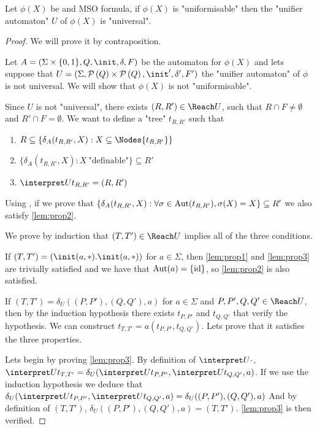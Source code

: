 \documentclass{article}
\begin{document}
\begin{lemma}
	Let $\phi(X)$ be and MSO formula, if $\phi(X)$ is "uniformisable" then the "unifier automaton" $U$ of $\phi(X)$ is "universal".
\end{lemma}

\begin{proof}
	We will prove it by contraposition.

	Let $A =  (\Sigma \times \{0,1\}, Q, \init, \delta, F)$ be the automaton for $\phi(X)$ and lets suppose that
	$U = (\Sigma, \parts Q \times \parts Q,\init', \delta', F')$ the "unifier automaton" of $\phi$ is not universal.
	We will show that $\phi(X)$ is not "uniformisable".

	Since $U$ is not "universal", there exists $(R,R') \in \Reach U$, such that $R \cap F \neq \emptyset$ and $R' \cap F = \emptyset$.
	We want to define a "tree" $t_{R,R'}$ such that
	\begin{enumerate}
		\item $R \subseteq \{ \delta_A (t_{R,R'},X) : X \subseteq \Nodes {t_{R,R'}}\}$ \label{lem:prop1}
		\item $\{ \delta_A (t_{R,R'},X) : X \ \text{"definable"}\} \subseteq R'$\label{lem:prop2}
		\item $\interpret U {t_{R,R'}} = (R,R')$\label{lem:prop3}
	\end{enumerate}

	Using , if we prove that $\{ \delta_A (t_{R,R'},X) : \forall \sigma \in \text{Aut}(t_{R,R'}), \sigma(X) = X\} \subseteq R'$ we also
	satisfy \ref{lem:prop2}.


	We prove by induction that $(T,T') \in \Reach U$ implies all of the three conditions.

	If $(T,T') = (\init(a,*). \init (a, *))$ for $a \in \Sigma$, then \ref{lem:prop1} and \ref{lem:prop3} are trivially satisfied and we have that
	$\text{Aut} (a) = \{\text{id}\}$, so \ref{lem:prop2} is also satisfied.


	If $(T,T') = \delta_U((P,P'),(Q,Q'),a)$ for $a \in \Sigma$ and $P,P',Q,Q' \in \Reach U$, then by the induction hypothesis there exists
	$t_{P,P'}$ and $t_{Q,Q'}$ that verify the hypothesis. We can construct $t_{T,T'} = a(t_{P,P'},t_{Q,Q'})$. Lets prove that it satisfies the
	three properties.

    Lets begin by proving \ref{lem:prop3}.
    By definition of $\interpret U {\cdot}$,
    $\interpret U {t_{T,T'}} = \delta_U (\interpret U {t_{P,P'}}, \interpret U {t_{Q,Q'}}, a)$.
    If we use the induction hypothesis we deduce that 
    $\delta_U (\interpret U {t_{P,P'}}, \interpret U {t_{Q,Q'}}, a) = \delta_U ((P,P'), (Q,Q'), a)$
    And by definition of $(T,T')$, $\delta_U ((P,P'), (Q,Q'), a) = (T,T')$.
    \ref{lem:prop3} is then verified.


\end{proof}
\end{document}
